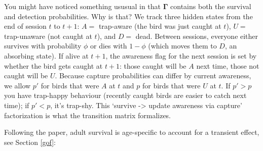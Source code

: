 \documentclass[
  12pt,
]{krantz}
\begin{document}
You might have noticed something ususual in that \(\mathbf{\Gamma}\) contains both the survival and detection probabilities. Why is that? We track three hidden states from the end of session \(t\) to \(t+1\): \(A =\) trap-aware (the bird was just caught at \(t\)), \(U =\) trap-unaware (not caught at \(t\)), and \(D =\) dead. Between sessions, everyone either survives with probability \(\phi\) or dies with \(1 - \phi\) (which moves them to \(D\), an absorbing state). If alive at \(t+1\), the awareness flag for the next session is set by whether the bird gets caught at \(t+1\): those caught will be \(A\) next time, those not caught will be \(U\). Because capture probabilities can differ by current awareness, we allow \(p'\) for birds that were \(A\) at \(t\) and \(p\) for birds that were \(U\) at \(t\). If \(p'>p\) you have trap-happy behaviour (recently caught birds are easier to catch next time); if \(p'<p\), it's trap-shy. This `survive -\textgreater{} update awareness via capture' factorization is what the transition matrix formalizes.

Following the paper, adult survival is age-specific to account for a transient effect, see Section \ref{gof}:
\end{document}
